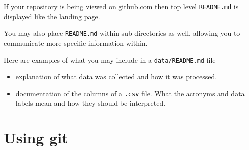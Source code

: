 \documentclass[
  letterpaper,
  DIV=11,
  numbers=noendperiod]{scrreprt}
\begin{document}
If your repository is being viewed on \url{github.com} then top level
\texttt{README.md} is displayed like the landing page.

\begin{tcolorbox}[enhanced jigsaw, bottomtitle=1mm, bottomrule=.15mm, toprule=.15mm, opacityback=0, leftrule=.75mm, breakable, colback=white, toptitle=1mm, left=2mm, coltitle=black, titlerule=0mm, opacitybacktitle=0.6, title=\textcolor{quarto-callout-tip-color}{\faLightbulb}\hspace{0.5em}{Tip}, rightrule=.15mm, arc=.35mm, colframe=quarto-callout-tip-color-frame, colbacktitle=quarto-callout-tip-color!10!white]

You may also place \texttt{README.md} within sub directories as well,
allowing you to communicate more specific information within.

Here are examples of what you may include in a \texttt{data/README.md}
file

\begin{itemize}
\item
  explanation of what data was collected and how it was processed.
\item
  documentation of the columns of a \texttt{.csv} file. What the
  acronyms and data labels mean and how they should be interpreted.
\end{itemize}

\end{tcolorbox}

\section{Using git}\label{sec-git}
\end{document}
